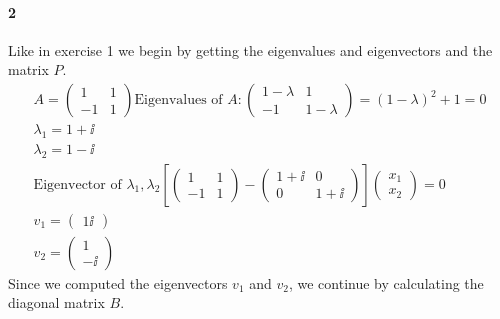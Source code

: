 \paragraph*{2}
Like in exercise 1 we begin by getting the eigenvalues and eigenvectors and the matrix $P$.
\begin{gather*}
A =\left( \begin{array}{cc}
1 & 1 \\ -1 & 1
\end{array} \right)
\text{Eigenvalues of } A:
\left( \begin{array}{cc}
1 - \lambda & 1 \\ 
-1 & 1 -\lambda 
\end{array} \right)
=
(1-\lambda)^2 + 1 = 0\\
\lambda _1 = 1 +\ii \\
\lambda _2 = 1 -\ii \\
\text{Eigenvector of }\lambda _1, \lambda _2
\left[
\left( \begin{array}{cc}
1 & 1 \\
-1 & 1
\end{array} \right) 
-
\left( \begin{array}{cc}
1+\ii & 0\\
0 & 1+\ii
\end{array} \right)
\right]
\left( \begin{array}{c}
x_1 \\ x_2
\end{array} \right)
= 0 \\
v_1 =
\left( \begin{array}{c}
1 \ii
\end{array} \right)
\\
v_2 =
\left( \begin{array}{c}
1 \\ -\ii
\end{array} \right)
\end{gather*}
Since we computed the eigenvectors $v_1$ and $v_2$, we continue by calculating the diagonal matrix $B$.
